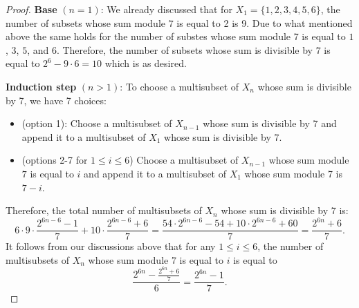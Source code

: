 \begin{solution}
\begin{proof}
\noindent \textbf{Base} $(n=1)$: We already discussed that for $X_1 = \{1,2,3,4,5,6\}$, the number of subsets whose sum module $7$ is equal to 2 is  9. Due to what mentioned above the same holds for the number of substes whose sum module 7 is equal to $1$, $3$, $5$, and $6$. Therefore, the number of subsets whose sum is divisible by $7$ is equal to $2^6-9\cdot 6=10$ which is as desired.

\noindent \textbf{Induction step} $(n>1)$: To choose a multisubset of $X_n$ whose sum is divisible by 7, we have 7 choices:
\begin{itemize}
	\item (option 1): Choose a multisubset of $X_{n-1}$ whose sum is divisible by 7  and append it to a multisubset of $X_1$ whose sum is divisible by 7.
	\item (options 2-7 for $1 \leq i \leq 6$) Choose a multisubset of $X_{n-1}$ whose sum module $7$ is equal to $i$ and append it to a multisubset of $X_1$ whose sum module 7 is $7-i$.
\end{itemize}
Therefore, the total number of multisubsets of $X_n$ whose sum is divisible by 7 is: $$6 \cdot 9 \cdot \frac{2^{6n-6} - 1}{7} + 10 \cdot \frac{2^{6n-6}+6}{7} = \frac{54 \cdot 2^{6n-6} - 54 + 10 \cdot 2^{6n-6} + 60}{7} = \frac{2^{6n} + 6}{7}.$$
It follows from our discussions above that for any $1 \leq i \leq 6$, the number of multisubsets of $X_n$ whose sum module $7$ is equal to $i$ is equal to $$\frac{2^{6n} - \frac{2^{6n}+6}{7}}{6} = \frac{2^{6n}-1}{7}.$$
\end{proof}
\end{solution}
